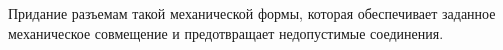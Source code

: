 Придание разъемам такой механической формы, которая
обеспечивает заданное механическое совмещение и
предотвращает недопустимые соединения.